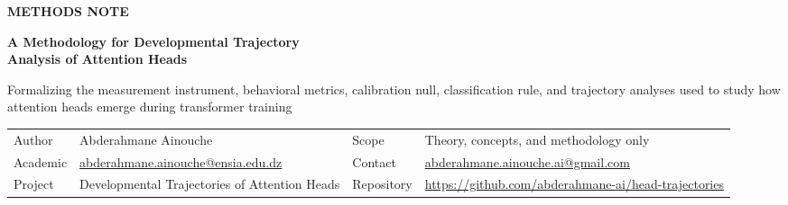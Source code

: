 \documentclass[11pt]{article}
\newcommand{\1}{\mathbf{1}}
\begin{document}
\thispagestyle{empty}

\vspace*{0.4cm}
{\sffamily\color{AccentDeep}\small\bfseries METHODS NOTE}

\vspace{0.55cm}

{\sffamily\fontsize{25}{30}\selectfont\bfseries\color{Ink}
A Methodology for Developmental Trajectory\\[-0.05em]
Analysis of Attention Heads
\par}

\vspace{0.5cm}

{\sffamily\large\color{Muted}
Formalizing the measurement instrument, behavioral metrics, calibration null,
classification rule, and trajectory analyses used to study how attention heads
emerge during transformer training
\par}

\vspace{0.9cm}

\begin{tabularx}{\textwidth}{@{}p{}Y p{0.14\textwidth}Y@{}}
\textcolor{Muted}{\sffamily Author} & Abderahmane Ainouche &
\textcolor{Muted}{\sffamily Scope} & Theory, concepts, and methodology only \\
\textcolor{Muted}{\sffamily Academic} & \href{mailto:abderahmane.ainouche@ensia.edu.dz}{abderahmane.ainouche@ensia.edu.dz} &
\textcolor{Muted}{\sffamily Contact} & \href{mailto:abderahmane.ainouche.ai@gmail.com}{abderahmane.ainouche.ai@gmail.com} \\
\textcolor{Muted}{\sffamily Project} & Developmental Trajectories of Attention Heads &
\textcolor{Muted}{\sffamily Repository} & \url{https://github.com/abderahmane-ai/head-trajectories} \\
\end{tabularx}

\vspace{0.9cm}
\end{document}
